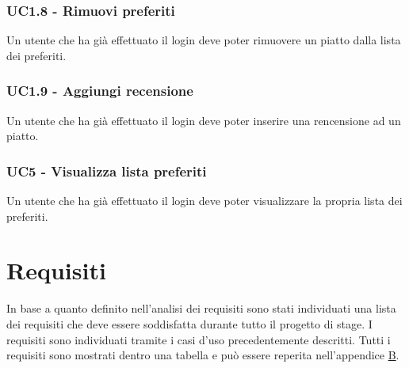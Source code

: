 \subsubsection{UC1.8 - Rimuovi preferiti}
Un utente che ha già effettuato il login deve poter rimuovere un piatto dalla lista dei preferiti.
\subsubsection{UC1.9 - Aggiungi recensione}
Un utente che ha già effettuato il login deve poter inserire una rencensione ad un piatto.
\subsubsection{UC5 - Visualizza lista preferiti}
Un utente che ha già effettuato il login deve poter visualizzare la propria lista dei preferiti.
\section{Requisiti}
In base a quanto definito nell'analisi dei requisiti sono stati individuati una lista dei requisiti che deve essere soddisfatta durante tutto il progetto di stage. I requisiti sono individuati tramite i casi d'uso precedentemente descritti. Tutti i requisiti sono mostrati dentro una tabella e può essere reperita nell'appendice {\hyperref[cap:appendice b]{B}}.